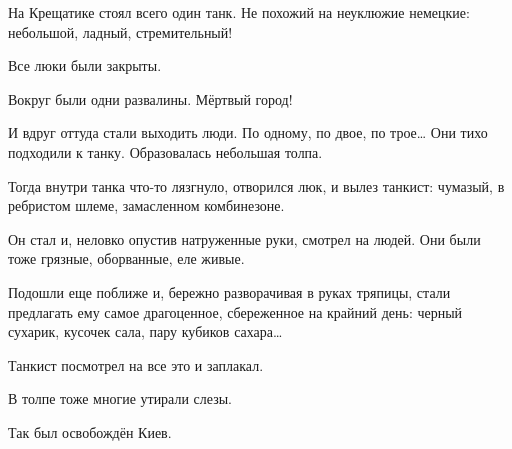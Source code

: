 На Крещатике стоял всего один танк. Не похожий на неуклюжие немецкие:
небольшой, ладный, стремительный!

Все люки были закрыты.

Вокруг были одни развалины. Мёртвый город!

И вдруг оттуда стали выходить люди. По одному, по двое, по трое… Они тихо
подходили к танку. Образовалась небольшая толпа.

Тогда внутри танка что-то лязгнуло, отворился люк, и вылез танкист: чумазый, в
ребристом шлеме, замасленном комбинезоне.

Он стал и, неловко опустив натруженные руки, смотрел на людей. Они были тоже
грязные, оборванные, еле живые.

Подошли еще поближе и, бережно разворачивая в руках тряпицы, стали предлагать
ему самое драгоценное, сбереженное на крайний день: черный сухарик, кусочек
сала, пару кубиков сахара…

Танкист посмотрел на все это и заплакал.

В толпе тоже многие утирали слезы.

Так был освобождён Киев.
